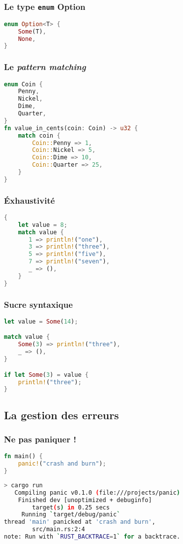\begin{frame}[fragile]
  \frametitle{Le type \texttt{enum} Option}
  \begin{lstlisting}[language=rust]
enum Option<T> {
    Some(T),
    None,
}
  \end{lstlisting}
\end{frame}

\begin{frame}[fragile]
  \frametitle{Le \textit{pattern matching}}
  \begin{lstlisting}[language=rust, basicstyle=\small{}]
enum Coin {
    Penny,
    Nickel,
    Dime,
    Quarter,
}
fn value_in_cents(coin: Coin) -> u32 {
    match coin {
        Coin::Penny => 1,
        Coin::Nickel => 5,
        Coin::Dime => 10,
        Coin::Quarter => 25,
    }
}
  \end{lstlisting}
\end{frame}

\begin{frame}[fragile]
  \frametitle{Éxhaustivité}
  \begin{lstlisting}[language=rust]
{
    let value = 8;
    match value {
       1 => println!("one"),
       3 => println!("three"),
       5 => println!("five"),
       7 => println!("seven"),
       _ => (),
    }
}
  \end{lstlisting}
\end{frame}


\begin{frame}[fragile]
  \frametitle{Sucre syntaxique}
  \begin{lstlisting}[language=rust]
let value = Some(14);

match value {
    Some(3) => println!("three"),
    _ => (),
}

if let Some(3) = value {
    println!("three");
}
  \end{lstlisting}
\end{frame}

\subsection{La gestion des erreurs}

\begin{frame}[fragile]
  \frametitle{Ne pas paniquer !}
  \begin{lstlisting}[language=rust]
fn main() {
    panic!("crash and burn");
}
  \end{lstlisting}
  \begin{lstlisting}[language=bash, basicstyle=\small{}]
> cargo run
   Compiling panic v0.1.0 (file:///projects/panic)
    Finished dev [unoptimized + debuginfo]
        target(s) in 0.25 secs
     Running `target/debug/panic`
thread 'main' panicked at 'crash and burn',
        src/main.rs:2:4
note: Run with `RUST_BACKTRACE=1` for a backtrace.
  \end{lstlisting}
\end{frame}


